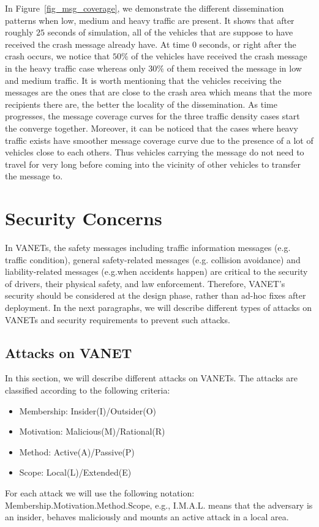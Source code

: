 \documentclass{IEEEtran}
\begin{document}
In Figure~\ref{fig_msg_coverage}, we demonstrate the different dissemination patterns when low, medium and heavy traffic are present.
It shows that after roughly $25$ seconds of simulation, all of the vehicles that are suppose to have received the crash message already have.
At time $0$ seconds, or right after the crash occurs, we notice that $50\%$ of the vehicles have received the crash message in the heavy traffic case whereas only $30\%$ of them received the message in low and medium traffic.
It is worth mentioning that the vehicles receiving the messages are the ones that are close to the crash area which means that the more recipients there are, the better the locality of the dissemination.
As time progresses, the message coverage curves for the three traffic density cases start the converge together.
Moreover, it can be noticed that the cases where heavy traffic exists have smoother message coverage curve due to the presence of a lot of vehicles close to each others.
Thus vehicles carrying the message do not need to travel for very long before coming into the vicinity of other vehicles to transfer the message to.



\section{Security Concerns}

In VANETs, the safety messages including traffic information messages (e.g. traffic condition), general safety-related messages (e.g. collision avoidance) and liability-related messages (e.g.when accidents happen) are critical to the security of drivers, their physical safety, and law enforcement. Therefore, VANET’s security should be considered at the design phase, rather than ad-hoc fixes after deployment. In the next paragraphs, we will describe different types of attacks on VANETs \cite{SecurityVANET, SecurityWSN} and security requirements to prevent such attacks.

\subsection{Attacks on VANET}

In this section, we will describe different attacks on VANETs. The attacks are classified according to the following criteria:
\begin{itemize}
\item Membership: Insider(I)/Outsider(O)
\item Motivation: Malicious(M)/Rational(R)
\item Method: Active(A)/Passive(P)
\item Scope: Local(L)/Extended(E)
\end{itemize}
For each attack we will use the following notation: Membership.Motivation.Method.Scope, e.g., I.M.A.L. means that the adversary is an insider, behaves maliciously and mounts an active attack in a local area.
\end{document}
